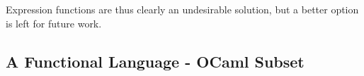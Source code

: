 \documentclass{kththesis}
\begin{document}
Expression functions are thus clearly an undesirable solution, but a better option is left for future work.





\subsection{A Functional Language - OCaml Subset} \label{sec:functional-eval}
\end{document}

